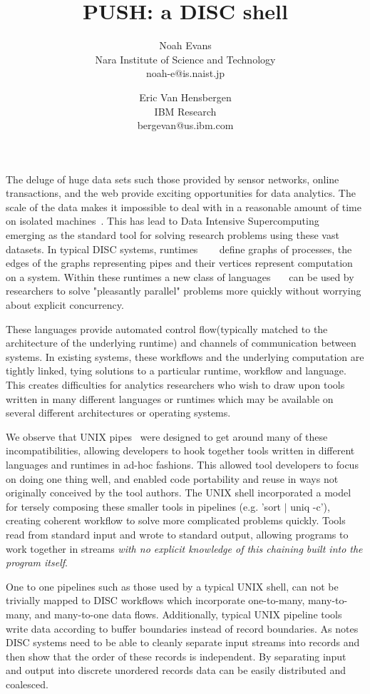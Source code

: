 \documentclass[11pt, letterpaper]{article}
\title{PUSH: a DISC shell}
\author{Noah Evans \\Nara Institute of Science and Technology \\noah-e@is.naist.jp  \and Eric Van Hensbergen \\IBM Research \\bergevan@us.ibm.com}
\date{}
\begin{document}
\maketitle

The deluge of huge data sets such those provided by sensor networks, 
online transactions, and the web provide exciting opportunities for data
analytics.  The scale of the data makes it impossible to deal with in a
reasonable amount of time on isolated machines~\cite{barroso2003wsp}.
This has lead to Data Intensive Supercomputing~\cite{bryant2007dis} emerging
as the standard tool for solving research problems using these vast datasets.
In typical DISC systems, 
runtimes ~\cite{dean2008msd}~\cite{bialecki:hfr}~\cite{isard2007ddd} define 
graphs of processes, the edges of the graphs representing 
pipes and their vertices represent computation on a system.  
Within these runtimes a new class of 
languages~\cite{pike2005idp}~\cite{yu2008dsg}~\cite{olston2008pln} 
can be used by researchers to solve "pleasantly parallel" 
problems more quickly without worrying about explicit concurrency.

These languages provide automated control flow(typically matched to the 
architecture of the underlying runtime) and channels of communication between 
systems.
In existing systems, these workflows and the underlying computation are 
tightly linked, tying solutions to a particular runtime, workflow and language.
This creates difficulties for analytics researchers who wish to draw upon
tools written in many different languages or runtimes which may be available
on several different architectures or operating systems.

We observe that UNIX pipes~\cite{mcilroy1964paf} were designed to get around 
many of these incompatibilities, allowing developers to hook together tools 
written in different languages and runtimes in ad-hoc fashions.  
This allowed tool developers to focus on doing one thing well, and
enabled code portability and reuse in ways not originally conceived by
the tool authors.  The UNIX shell incorporated a model for tersely composing 
these smaller tools in pipelines (e.g. 'sort $|$ uniq -c'),  
creating coherent workflow to solve more complicated problems 
quickly. 
Tools read from standard input and wrote to standard output, allowing programs 
to work together in streams \emph{with no explicit knowledge of this chaining
built into the program itself}.

One to one pipelines such as those used by a typical UNIX shell, can not be 
trivially mapped to DISC workflows which incorporate one-to-many, many-to-many,
and many-to-one data flows. 
Additionally, typical UNIX pipeline tools write data according to buffer 
boundaries instead of record boundaries.
As \cite{pike2005idp} notes DISC systems need to be able to cleanly separate 
input streams into records and then show that the order of these records is 
independent. 
By separating input and output into discrete unordered records data can be 
easily distributed and coalesced.
\end{document}
